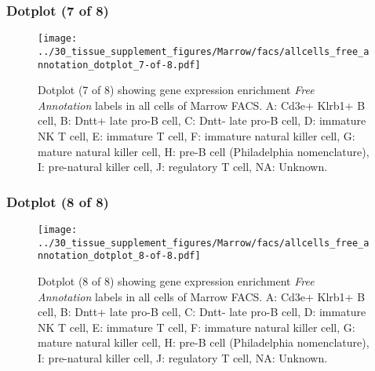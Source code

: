 \clearpage

\subsubsection{Dotplot (7 of 8)}
\begin{figure}[h]
\centering
\texttt{[image: ../30\_tissue\_supplement\_figures/Marrow/facs/allcells\_free\_annotation\_dotplot\_7-of-8.pdf]}

\caption{ Dotplot (7 of 8)  showing gene expression enrichment \emph{Free Annotation} labels in all cells of Marrow FACS. A: Cd3e+ Klrb1+ B cell, B: Dntt+ late pro-B cell, C: Dntt- late pro-B cell, D: immature NK T cell, E: immature T cell, F: immature natural killer cell, G: mature natural killer cell, H: pre-B cell (Philadelphia nomenclature), I: pre-natural killer cell, J: regulatory T cell, NA: Unknown.}
\end{figure}


\clearpage

\subsubsection{Dotplot (8 of 8)}
\begin{figure}[h]
\centering
\texttt{[image: ../30\_tissue\_supplement\_figures/Marrow/facs/allcells\_free\_annotation\_dotplot\_8-of-8.pdf]}

\caption{ Dotplot (8 of 8)  showing gene expression enrichment \emph{Free Annotation} labels in all cells of Marrow FACS. A: Cd3e+ Klrb1+ B cell, B: Dntt+ late pro-B cell, C: Dntt- late pro-B cell, D: immature NK T cell, E: immature T cell, F: immature natural killer cell, G: mature natural killer cell, H: pre-B cell (Philadelphia nomenclature), I: pre-natural killer cell, J: regulatory T cell, NA: Unknown.}
\end{figure}

